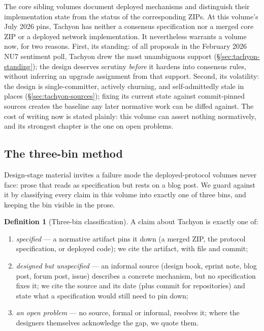 \documentclass[11pt,a4paper]{article}
\theoremstyle{definition}
\newtheorem{definition}[theorem]{Definition}
\begin{document}
The core sibling volumes document deployed mechanisms and distinguish
their implementation state from the status of the corresponding ZIPs.
At this volume's July 2026 pins, Tachyon has neither a consensus
specification nor a merged core ZIP or a deployed network implementation.
It nevertheless warrants a volume now, for two reasons. First, its standing:
of all proposals in the February 2026 NU7 sentiment poll, Tachyon drew the
most unambiguous support (\S\ref{sec:tachyon-standing}); the design
deserves scrutiny \emph{before} it hardens into consensus rules, without
inferring an upgrade assignment from that support. Second, its
volatility: the design is single-committer, actively churning, and
self-admittedly stale in places
(\S\ref{sec:tachyon-sources}); fixing its current state against commit-pinned
sources creates the baseline any later normative work can be diffed against.
The cost of writing now is stated plainly: this volume can assert nothing
normatively, and its strongest chapter is the one on open problems.

\subsection{The three-bin method}\label{sec:tachyon-bins}

Design-stage material invites a failure mode the deployed-protocol volumes
never face: prose that reads as specification but rests on a blog post. We
guard against it by classifying every claim in this volume into exactly one of
three bins, and keeping the bin visible in the prose.

\begin{definition}[Three-bin classification]\label{def:three-bins}
A claim about Tachyon is exactly one of:
\begin{enumerate}[label=(\roman*)]
\item \emph{specified} --- a normative artifact pins it down (a merged ZIP, the
  protocol specification, or deployed code); we cite the artifact, with file
  and commit;
\item \emph{designed but unspecified} --- an informal source (design book,
  eprint note, blog post, forum post, issue) describes a concrete mechanism,
  but no specification fixes it; we cite the source and its date (plus commit
  for repositories) and state what a specification would still need to pin
  down;
\item \emph{an open problem} --- no source, formal or informal, resolves it;
  where the designers themselves acknowledge the gap, we quote them.
\end{enumerate}
\end{definition}
\end{document}
